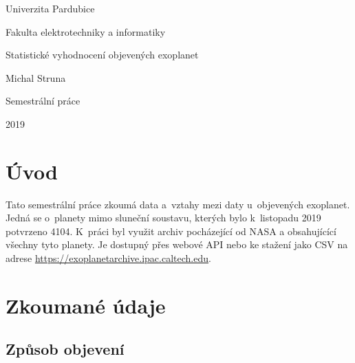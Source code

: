 \documentclass[a4paper,12pt]{article}
\begin{document}



\begin{titlepage}
\begin{center}
\Large \rmfamily
Univerzita Pardubice
\par
Fakulta elektrotechniky a informatiky
\par
\vspace{0pt plus 3fill}
Statistické vyhodnocení objevených exoplanet
\par
\bigskip
\par
Michal Struna
\par
\vspace{0pt plus 5fill}
Semestrální práce
\par
2019
\end{center}
\end{titlepage}



\section{Úvod}

Tato semestrální práce zkoumá data a~vztahy mezi daty u~objevených exoplanet. Jedná se o~planety mimo sluneční soustavu, kterých bylo k~listopadu 2019 potvrzeno 4104. K~práci byl využit archiv pocházející od NASA a obsahujícící všechny tyto planety. Je dostupný přes webové API nebo ke stažení jako CSV na adrese \url{https://exoplanetarchive.ipac.caltech.edu}.

\section{Zkoumané údaje}
\subsection{Způsob objevení}
\end{document}

